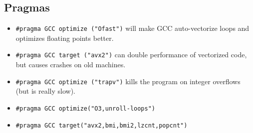 	\subsection{Pragmas}
		\begin{itemize}
			\item \lstinline{#pragma GCC optimize ("Ofast")} will make GCC auto-vectorize loops and optimizes floating points better.
			\item \lstinline{#pragma GCC target ("avx2")} can double performance of vectorized code, but causes crashes on old machines.
			\item \lstinline{#pragma GCC optimize ("trapv")} kills the program on integer overflows (but is really slow).
            \item \lstinline{#pragma GCC optimize("O3,unroll-loops")}
            \item \lstinline{#pragma GCC target("avx2,bmi,bmi2,lzcnt,popcnt")}
        \end{itemize}
